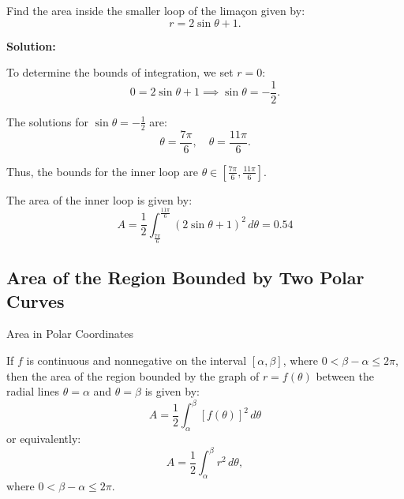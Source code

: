 \documentclass[12pt]{article}
\theoremstyle{beautifulthm}
\begin{document}
\begin{tcolorbox}[colback=examplebg, colframe=red!75!black, title=\textbf{EXAMPLE 2: Area of One Petal of a Rose Curve}, fonttitle=\bfseries, sharp corners]

Find the area inside the smaller loop of the limaçon given by:
\[
r = 2\sin\theta + 1.
\]


\tcblower
\textbf{Solution:} 

To determine the bounds of integration, we set \( r = 0 \):
\[
0 = 2\sin\theta + 1 \implies \sin\theta = -\frac{1}{2}.
\]

The solutions for \( \sin\theta = -\frac{1}{2} \) are:
\[
\theta = \frac{7\pi}{6}, \quad \theta = \frac{11\pi}{6}.
\]

Thus, the bounds for the inner loop are \( \theta \in \left[\frac{7\pi}{6}, \frac{11\pi}{6}\right] \).

The area of the inner loop is given by:
\[
A = \frac{1}{2} \int_{\frac{7\pi}{6}}^{\frac{11\pi}{6}} \left( 2\sin\theta + 1 \right)^2 \, d\theta = 0.54
\]






\end{tcolorbox}

\newpage
\subsection{Area of the Region Bounded by Two Polar Curves}

\begin{Note}{Area in Polar Coordinates}{}

If \( f \) is continuous and nonnegative on the interval \([ \alpha, \beta ]\), where \( 0 < \beta - \alpha \leq 2\pi \), then the area of the region bounded by the graph of \( r = f(\theta) \) between the radial lines \( \theta = \alpha \) and \( \theta = \beta \) is given by:
\[
A = \frac{1}{2} \int_\alpha^\beta \left[ f(\theta) \right]^2 \, d\theta
\]
or equivalently:
\[
A = \frac{1}{2} \int_\alpha^\beta r^2 \, d\theta,
\]
where \( 0 < \beta - \alpha \leq 2\pi \).

    
\end{Note}
\end{document}
